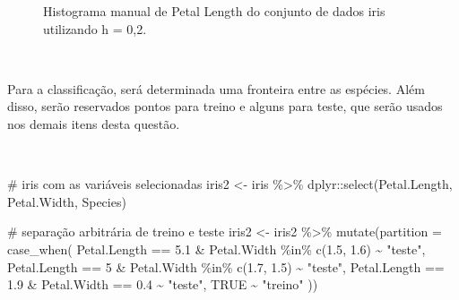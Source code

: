 \documentclass[
  a4paperpaper,
]{article}
\newenvironment{Shaded}{\begin{snugshade}}{\end{snugshade}}
\newcommand{\AttributeTok}[1]{\textcolor[rgb]{0.40,0.45,0.13}{#1}}
\newcommand{\CommentTok}[1]{\textcolor[rgb]{0.37,0.37,0.37}{#1}}
\newcommand{\ConstantTok}[1]{\textcolor[rgb]{0.56,0.35,0.01}{#1}}
\newcommand{\DecValTok}[1]{\textcolor[rgb]{0.68,0.00,0.00}{#1}}
\newcommand{\FloatTok}[1]{\textcolor[rgb]{0.68,0.00,0.00}{#1}}
\newcommand{\FunctionTok}[1]{\textcolor[rgb]{0.28,0.35,0.67}{#1}}
\newcommand{\NormalTok}[1]{\textcolor[rgb]{0.00,0.23,0.31}{#1}}
\newcommand{\OtherTok}[1]{\textcolor[rgb]{0.00,0.23,0.31}{#1}}
\newcommand{\SpecialCharTok}[1]{\textcolor[rgb]{0.37,0.37,0.37}{#1}}
\newcommand{\StringTok}[1]{\textcolor[rgb]{0.13,0.47,0.30}{#1}}
\begin{document}
\begin{figure}[H]


\caption{\label{fig-histogramairis2}Histograma manual de Petal Length do
conjunto de dados iris utilizando h = 0,2.}

\end{figure}%

~

Para a classificação, será determinada uma fronteira entre as espécies.
Além disso, serão reservados pontos para treino e alguns para teste, que
serão usados nos demais itens desta questão.

~

\begin{Shaded}
\begin{Highlighting}[]
\CommentTok{\# iris com as variáveis selecionadas}
\NormalTok{iris2 }\OtherTok{\textless{}{-}}\NormalTok{ iris }\SpecialCharTok{\%\textgreater{}\%}\NormalTok{ dplyr}\SpecialCharTok{::}\FunctionTok{select}\NormalTok{(Petal.Length, Petal.Width, Species)}

\CommentTok{\# separação arbitrária de treino e teste}
\NormalTok{iris2 }\OtherTok{\textless{}{-}}\NormalTok{ iris2 }\SpecialCharTok{\%\textgreater{}\%}
  \FunctionTok{mutate}\NormalTok{(}\AttributeTok{partition =} \FunctionTok{case\_when}\NormalTok{(}
\NormalTok{    Petal.Length }\SpecialCharTok{==} \FloatTok{5.1} \SpecialCharTok{\&}\NormalTok{ Petal.Width }\SpecialCharTok{\%in\%} \FunctionTok{c}\NormalTok{(}\FloatTok{1.5}\NormalTok{, }\FloatTok{1.6}\NormalTok{) }\SpecialCharTok{\textasciitilde{}} \StringTok{"teste"}\NormalTok{,}
\NormalTok{    Petal.Length }\SpecialCharTok{==} \DecValTok{5} \SpecialCharTok{\&}\NormalTok{ Petal.Width }\SpecialCharTok{\%in\%} \FunctionTok{c}\NormalTok{(}\FloatTok{1.7}\NormalTok{, }\FloatTok{1.5}\NormalTok{) }\SpecialCharTok{\textasciitilde{}} \StringTok{"teste"}\NormalTok{,}
\NormalTok{    Petal.Length }\SpecialCharTok{==} \FloatTok{1.9} \SpecialCharTok{\&}\NormalTok{ Petal.Width }\SpecialCharTok{==} \FloatTok{0.4} \SpecialCharTok{\textasciitilde{}} \StringTok{"teste"}\NormalTok{,}
    \ConstantTok{TRUE} \SpecialCharTok{\textasciitilde{}} \StringTok{"treino"}
\NormalTok{  ))}
\end{Highlighting}
\end{Shaded}
\end{document}
